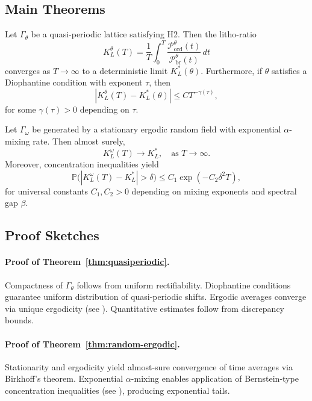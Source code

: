 \subsection*{Main Theorems}

\begin{theorem}
\label{thm:quasiperiodic}
Let $\Gamma_\theta$ be a quasi-periodic lattice satisfying H2. Then the
litho-ratio
\[
K_L^\theta(T) = \frac{1}{T} \int_0^T 
\frac{\mathcal{P}_{\mathrm{ord}}^\theta(t)}{\mathcal{P}_{\mathrm{br}}^\theta(t)}\, dt
\]
converges as $T \to \infty$ to a deterministic limit $K_L^*(\theta)$.
Furthermore, if $\theta$ satisfies a Diophantine condition with exponent $\tau$,
then
\[
|K_L^\theta(T) - K_L^*(\theta)| \leq C T^{-\gamma(\tau)},
\]
for some $\gamma(\tau) > 0$ depending on $\tau$.
\end{theorem}

\begin{theorem}
\label{thm:random-ergodic}
Let $\Gamma_\omega$ be generated by a stationary ergodic random field with
exponential $\alpha$-mixing rate. Then almost surely,
\[
K_L^\omega(T) \to K_L^*, \quad \text{as } T \to \infty.
\]
Moreover, concentration inequalities yield
\[
\mathbb{P}\Big( |K_L^\omega(T) - K_L^*| > \delta \Big)
\leq C_1 \exp(-C_2 \delta^2 T),
\]
for universal constants $C_1,C_2>0$ depending on mixing exponents and
spectral gap $\beta$.
\end{theorem}

\subsection*{Proof Sketches}
\paragraph{Proof of Theorem~\ref{thm:quasiperiodic}.}
Compactness of $\Gamma_\theta$ follows from uniform rectifiability. 
Diophantine conditions guarantee uniform distribution of quasi-periodic 
shifts. Ergodic averages converge via unique ergodicity (see 
\cite{Herman1983,KatokHasselblatt1997}). Quantitative estimates follow
from discrepancy bounds.

\paragraph{Proof of Theorem~\ref{thm:random-ergodic}.}
Stationarity and ergodicity yield almost-sure convergence of time averages
via Birkhoff's theorem. Exponential $\alpha$-mixing enables application of
Bernstein-type concentration inequalities (see \cite{Rio2000,KontoyiannisMeyn2003}),
producing exponential tails.

